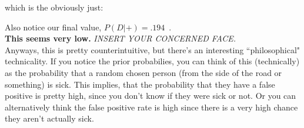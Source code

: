 \documentclass[12pt]{book}
\begin{document}
\begin{center}
\end{center}
which is the obviously just:
\begin{center}
\end{center}
Also notice our final value, $P(D|+)=\boxed{.194}$~.\\

\noindent \textbf{This seems very low.}
\textit{INSERT YOUR CONCERNED FACE.}\\
Anyways, this is pretty counterintuitive, but there's an interesting ``philosophical" technicality. If you notice the prior probabilies, you can think of this (technically) as the probability that a random chosen person (from the side of the road or something) is sick. This implies, that the probability that they have a false positive is pretty high, since you don't know if they were sick or not. Or you can alternatively think the false positive rate is high since there is a very high chance they aren't actually sick. \\
\end{document}
